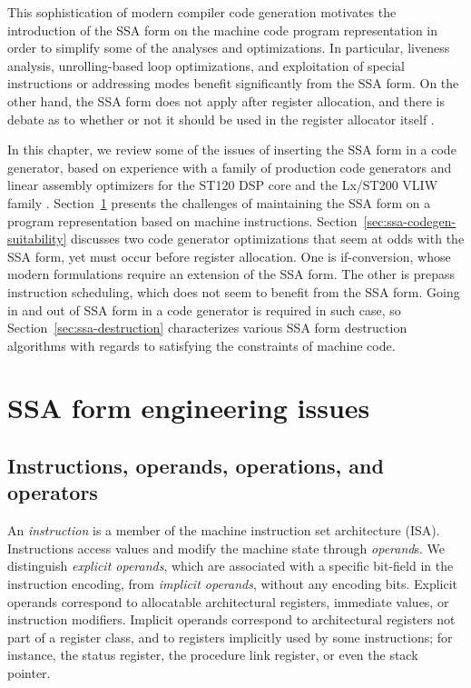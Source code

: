 This sophistication of modern compiler code generation motivates the
introduction of the SSA form on the machine code program representation in order to simplify
some of the analyses and optimizations. In particular, liveness analysis,
unrolling-based loop optimizations, and exploitation of special instructions or
addressing modes benefit significantly from the SSA form. On the other hand,
the SSA form does not apply after register allocation, and there is
debate as to whether or not it should be used in the register allocator itself
\cite{Barik:2013:TACO}.

In this chapter, we review some of the issues of inserting the SSA form in a code
generator, based on experience with a family of production code generators and linear
assembly optimizers for the ST120 DSP core \cite{Dinechin:2000:ME}
\cite{Dinechin:2000:CASES,Stoutchinin:2001:MICRO,Rastello:2004:CGO} and the
Lx/ST200 VLIW family \cite{Faraboschi:2000:ISCA}
\cite{Dinechin:2007:MISTA,Dinechin:2008:EuroPar,Boissinot:2008:CGO,Boissinot:2009:CGO,Boissinot:2011:APLAS}.
Section~\ref{sec:ssa-codegen-engineering} presents the challenges of maintaining
the SSA form on a program representation based on machine instructions.
Section~\ref{sec:ssa-codegen-suitability} discusses two code generator
optimizations that seem at odds with the SSA form, yet must occur before register
allocation. One is if-conversion, whose modern formulations require an extension
of the SSA form. The other is prepass instruction scheduling, which
does not seem to benefit from the SSA form.  Going in and out of SSA form in a
code generator is required in such case, so Section~\ref{sec:ssa-destruction}
characterizes various SSA form destruction algorithms with regards to satisfying
the constraints of machine code.


\section{SSA form engineering issues}
\label{sec:ssa-codegen-engineering}

\subsection{Instructions, operands, operations, and operators}

An \emph{instruction} is a member of the machine instruction set architecture
(ISA). Instructions access values and modify the machine state through
\emph{operand}s. We distinguish \emph{explicit operands}, which are associated
with a specific bit-field in the instruction encoding, from \emph{implicit
operands}, without any encoding bits.  Explicit operands correspond to
allocatable architectural registers, immediate values, or instruction modifiers.
Implicit operands correspond to architectural registers not part of a register
class, and to registers implicitly used by some instructions; for instance, the
status register, the procedure link register, or even the stack pointer.

